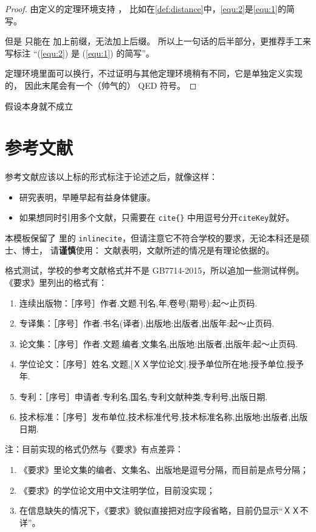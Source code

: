 \begin{proof}
由定义的定理环境支持 ，
比如在\autoref{def:distance}中，\autoref{equ:2}是\autoref{equ:1}的简写。

但是  只能在  加上前缀，无法加上后缀。
所以上一句话的后半部分，更推荐手工来写标注 “(\ref{equ:2}) 是 (\ref{equ:1}) 的简写”。

定理环境里面可以换行，不过证明与其他定理环境稍有不同，它是单独定义实现的，
因此末尾会有一个（帅气的） QED 符号。
\end{proof}

\begin{assumption}
\label{assume:fail}
假设本身就不成立
\end{assumption}


\section{参考文献}
\label{sec:bib}
参考文献应该以上标的形式标注于论述之后，就像这样：

\begin{itemize}
\item 研究表明\cite{r1}，早睡早起有益身体健康。
\item 如果想同时引用多个文献\cite{r2,r3,r4,r6}，只需要在 \verb|cite{}| 中用逗号分开\texttt{citeKey}就好。
\end{itemize}

本模板保留了 \cquthesis{} 里的 \texttt{inlinecite}，但请注意它不符合学校的要求，无论本科还是硕士、博士，
请\textbf{谨慎}使用：
文献表明，文献所述的情况是有理论依据的。

\nuaathesis 格式测试，学校的参考文献格式并不是 GB7714-2015，所以追加一些测试样例。
《要求》里列出的格式有：
\begin{enumerate}
  \item 连续出版物\cite{n11,n12}：［序号］作者.文题.刊名,年,卷号(期号):起～止页码.
  \item 专译集\cite{n21,n22}：［序号］作者.书名(译者).出版地:出版者,出版年:起～止页码.
  \item 论文集\cite{n31,n32}：［序号］作者.文题.编者,文集名,出版地:出版者,出版年:起～止页码.
  \item 学位论文\cite{n41,n42,n43}：［序号］姓名.文题,[ＸＸ学位论文].授予单位所在地:授予单位,授予年.
  \item 专利\cite{n51,n52,n53}：［序号］申请者.专利名,国名,专利文献种类,专利号,出版日期.
  \item 技术标准\cite{n61,n62,n63}：［序号］发布单位,技术标准代号,技术标准名称,出版地:出版者,出版日期.
\end{enumerate}

注：目前实现的格式仍然与《要求》有点差异：
\begin{enumerate}
  \item 《要求》里论文集的编者、文集名、出版地是逗号分隔，而目前是点号分隔；
  \item 《要求》的学位论文用中文注明学位，目前没实现；
  \item 在信息缺失的情况下，《要求》貌似直接把对应字段省略，目前仍显示“ＸＸ不详”。
\end{enumerate}
